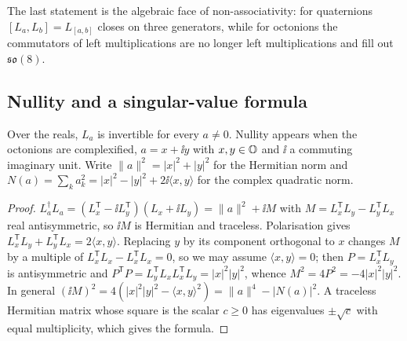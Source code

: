 The last statement is the algebraic face of non-associativity: for quaternions $[L_a,L_b]=L_{[a,b]}$ closes on three generators, while for octonions the commutators of left multiplications are no longer left multiplications and fill out $\mathfrak{so}(8)$.

\subsection*{Nullity and a singular-value formula}

Over the reals, $L_a$ is invertible for every $a\ne0$. Nullity appears when the octonions are complexified, $a=x+\ii y$ with $x,y\in\mathbb{O}$ and $\ii$ a commuting imaginary unit. Write $\|a\|^2=|x|^2+|y|^2$ for the Hermitian norm and $N(a)=\sum_ka_k^2=|x|^2-|y|^2+2\ii\langle x,y\rangle$ for the complex quadratic norm.


\begin{proof}
$L_a^\dagger L_a=(L_x^{\mathsf T}-\ii L_y^{\mathsf T})(L_x+\ii L_y)=\|a\|^2+\ii M$ with $M=L_x^{\mathsf T}L_y-L_y^{\mathsf T}L_x$ real antisymmetric, so $\ii M$ is Hermitian and traceless. Polarisation gives $L_x^{\mathsf T}L_y+L_y^{\mathsf T}L_x=2\langle x,y\rangle$. Replacing $y$ by its component orthogonal to $x$ changes $M$ by a multiple of $L_x^{\mathsf T}L_x-L_x^{\mathsf T}L_x=0$, so we may assume $\langle x,y\rangle=0$; then $P=L_x^{\mathsf T}L_y$ is antisymmetric and $P^{\mathsf T}P=L_y^{\mathsf T}L_xL_x^{\mathsf T}L_y=|x|^2|y|^2$, whence $M^2=4P^2=-4|x|^2|y|^2$. In general $(\ii M)^2=4(|x|^2|y|^2-\langle x,y\rangle^2)=\|a\|^4-|N(a)|^2$. A traceless Hermitian matrix whose square is the scalar $c\ge0$ has eigenvalues $\pm\sqrt c$ with equal multiplicity, which gives the formula.
\end{proof}

